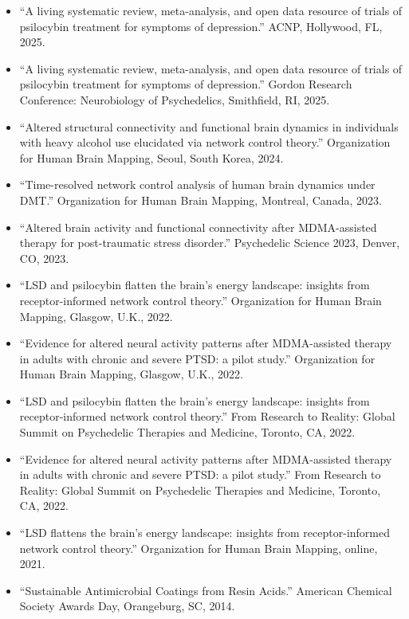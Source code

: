 \documentclass[11pt, letterpaper]{article}
\begin{document}
\begin{itemize}
  \item ``A living systematic review, meta-analysis, and open data resource of trials of psilocybin treatment for symptoms of depression.'' ACNP, Hollywood, FL, 2025.
  \item ``A living systematic review, meta-analysis, and open data resource of trials of psilocybin treatment for symptoms of depression.'' Gordon Research Conference: Neurobiology of Psychedelics, Smithfield, RI, 2025.
  \item ``Altered structural connectivity and functional brain dynamics in individuals with heavy alcohol use elucidated via network control theory.'' Organization for Human Brain Mapping, Seoul, South Korea, 2024.
  \item ``Time-resolved network control analysis of human brain dynamics under DMT.'' Organization for Human Brain Mapping, Montreal, Canada, 2023.
  \item ``Altered brain activity and functional connectivity after MDMA-assisted therapy for post-traumatic stress disorder.'' Psychedelic Science 2023, Denver, CO, 2023.
  \item ``LSD and psilocybin flatten the brain's energy landscape: insights from receptor-informed network control theory.'' Organization for Human Brain Mapping, Glasgow, U.K., 2022.
  \item ``Evidence for altered neural activity patterns after MDMA-assisted therapy in adults with chronic and severe PTSD: a pilot study.'' Organization for Human Brain Mapping, Glasgow, U.K., 2022.
  \item ``LSD and psilocybin flatten the brain's energy landscape: insights from receptor-informed network control theory.'' From Research to Reality: Global Summit on Psychedelic Therapies and Medicine, Toronto, CA, 2022.
  \item ``Evidence for altered neural activity patterns after MDMA-assisted therapy in adults with chronic and severe PTSD: a pilot study.'' From Research to Reality: Global Summit on Psychedelic Therapies and Medicine, Toronto, CA, 2022.
  \item ``LSD flattens the brain's energy landscape: insights from receptor-informed network control theory.'' Organization for Human Brain Mapping, online, 2021.
  \item ``Sustainable Antimicrobial Coatings from Resin Acids.'' American Chemical Society Awards Day, Orangeburg, SC, 2014.
\end{itemize}
\end{document}
